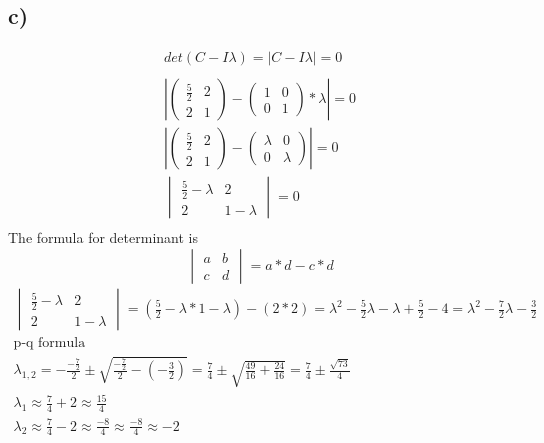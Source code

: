 \documentclass[12pt]{article}
\begin{document}
\subsection{c)}
\begin{gather*}
    det(C - I\lambda) = |C - I\lambda |= 0  \\
    \\
    \left|
    \begin{pmatrix}
        \frac{5}{2} & 2 \\
        2 & 1 
    \end{pmatrix}
    -
    \begin{pmatrix}
        1 & 0 \\
        0 & 1 
    \end{pmatrix}
    * \lambda \right| = 0 
\\
    \left|
    \begin{pmatrix}
        \frac{5}{2} & 2 \\
        2 & 1 
    \end{pmatrix}
    -
    \begin{pmatrix}
        \lambda & 0 \\
        0 & \lambda 
    \end{pmatrix}
    \right| = 0 
    \\
    \begin{vmatrix}
        \frac{5}{2} - \lambda & 2 \\
        2 & 1 -\lambda
    \end{vmatrix}
    = 0 \\
\end{gather*}
The formula for determinant is $$ 
\begin{vmatrix}
    a & b \\
    c & d 
\end{vmatrix}
= a * d - c * d $$
\begin{gather*}
    \begin{vmatrix}
        \frac{5}{2} - \lambda & 2 \\
        2 & 1 -\lambda
    \end{vmatrix}
    =(\frac{5}{2} - \lambda * 1 - \lambda) - (2 * 2) =\lambda^2 - \frac{5}{2}\lambda - \lambda + \frac{5}{2} - 4 =  \lambda^2 -\frac{7}{2}\lambda -\frac{3}{2} \\
    \text{p-q formula} \\
    \lambda_{1,2} =  -\frac{-\frac{7}{2}}{2} \pm \sqrt{\frac{-\frac{7}{2}}{2} - (-\frac{3}{2})} = \frac{7}{4} \pm \sqrt{\frac{49}{16}+ \frac{24}{16}} = \frac{7}{4} \pm \frac{\sqrt{73}}{4} \\
    \lambda_1 \approx \frac{7}{4} + 2 \approx \frac{15}{4} \\
    \lambda_2 \approx \frac{7}{4} - 2 \approx \frac{-8}{4}\approx \frac{-8}{4}\approx -2  
\end{gather*}
\end{document}
